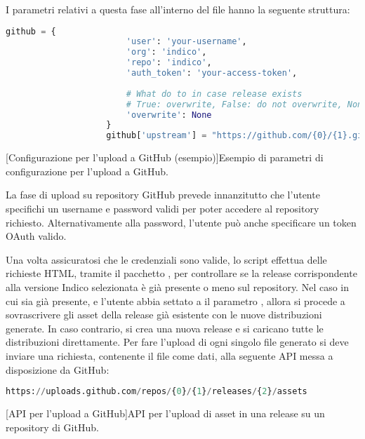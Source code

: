             I parametri relativi a questa fase all'interno del file  hanno la seguente struttura:
            
            \begin{center}
                \begin{lstlisting}[language=python, gobble=18]
                    github = {
                        'user': 'your-username',
                        'org': 'indico',
                        'repo': 'indico',
                        'auth_token': 'your-access-token',
                    
                        # What do to in case release exists
                        # True: overwrite, False: do not overwrite, None: ask
                        'overwrite': None
                    }
                    github['upstream'] = "https://github.com/{0}/{1}.git".format(github['org'], github['repo'])
                \end{lstlisting}
                \captionsetup{textformat=empty,labelformat=empty} \vspace{-2em}
                [Configurazione per l'upload a GitHub (esempio)]{Esempio di parametri di configurazione per l'upload a GitHub.}
            \end{center}
            
            La fase di upload su repository GitHub prevede innanzitutto che l'utente specifichi un username e password validi per poter accedere al repository richiesto. Alternativamente alla password, l'utente può anche specificare un token OAuth valido.
            
            Una volta assicuratosi che le credenziali sono valide, lo script effettua delle richieste \ac{HTML}, tramite il pacchetto , per controllare se la release corrispondente alla versione Indico selezionata è già presente o meno sul repository. Nel caso in cui sia già presente, e l'utente abbia settato a  il parametro , allora si procede a sovrascrivere gli asset della release già esistente con le nuove distribuzioni generate. In caso contrario, si crea una nuova release e si caricano tutte le distribuzioni direttamente. Per fare l'upload di ogni singolo file generato si deve inviare una richiesta, contenente il file come dati, alla seguente \ac{API} messa a disposizione da GitHub:
            
            \begin{center}
                \begin{lstlisting}[language=python, gobble=18]
                    https://uploads.github.com/repos/{0}/{1}/releases/{2}/assets
                \end{lstlisting}
                \captionsetup{textformat=empty,labelformat=empty} \vspace{-2em}
                [API per l'upload a GitHub]{API per l'upload di asset in una release su un repository di GitHub.}
            \end{center}
            
